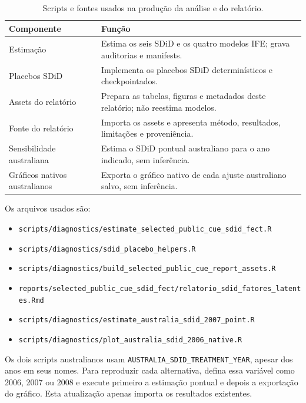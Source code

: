 \documentclass[
  brazilian,
  11pt,
]{article}
\begin{document}
\begin{table}[!h]
\centering
\caption{\label{tab:table-scripts}Scripts e fontes usados na produção da análise e do relatório.}
\centering
\fontsize{8.5}{10.5}\selectfont
\begin{tabular}[t]{>{\raggedright\arraybackslash}p{3.2cm}>{\raggedright\arraybackslash}p{10.7cm}}
\toprule
Componente & Função\\
\midrule
Estimação & Estima os seis SDiD e os quatro modelos IFE; grava auditorias e manifests.\\
Placebos SDiD & Implementa os placebos SDiD determinísticos e checkpointados.\\
Assets do relatório & Prepara as tabelas, figuras e metadados deste relatório; não reestima modelos.\\
Fonte do relatório & Importa os assets e apresenta método, resultados, limitações e proveniência.\\
Sensibilidade australiana & Estima o SDiD pontual australiano para o ano indicado, sem inferência.\\
\addlinespace
Gráficos nativos australianos & Exporta o gráfico nativo de cada ajuste australiano salvo, sem inferência.\\
\bottomrule
\end{tabular}
\end{table}

Os arquivos usados são:

\begin{itemize}
\item \nolinkurl{scripts/diagnostics/estimate_selected_public_cue_sdid_fect.R}
\item \nolinkurl{scripts/diagnostics/sdid_placebo_helpers.R}
\item \nolinkurl{scripts/diagnostics/build_selected_public_cue_report_assets.R}
\item \nolinkurl{reports/selected_public_cue_sdid_fect/relatorio_sdid_fatores_latentes.Rmd}
\item \nolinkurl{scripts/diagnostics/estimate_australia_sdid_2007_point.R}
\item \nolinkurl{scripts/diagnostics/plot_australia_sdid_2006_native.R}
\end{itemize}

Os dois scripts australianos usam
\texttt{AUSTRALIA\_SDID\_TREATMENT\_YEAR}, apesar dos anos em seus
nomes. Para reproduzir cada alternativa, defina essa variável como 2006,
2007 ou 2008 e execute primeiro a estimação pontual e depois a
exportação do gráfico. Esta atualização apenas importa os resultados
existentes.
\end{document}
